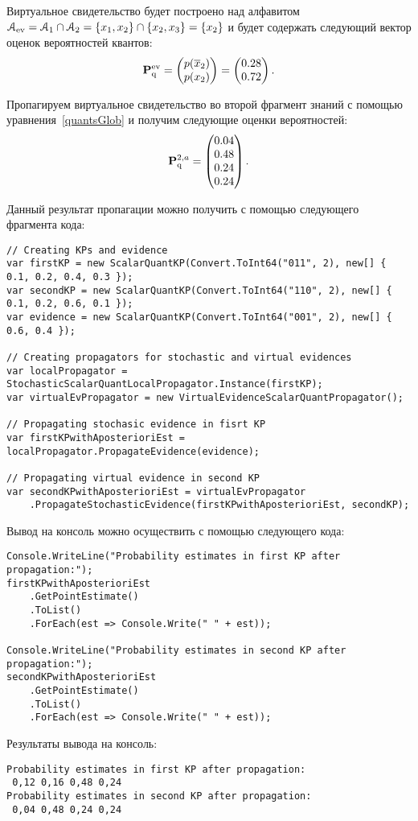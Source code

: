 Виртуальное свидетельство будет построено над алфавитом $\mathcal{A}_{\mathrm{ev}} = \mathcal{A}_1 \cap \mathcal{A}_2 = \{x_1, x_2\} \cap \{x_2, x_3\} = \{x_2\}$ и будет содержать следующий вектор оценок вероятностей квантов:
\begin{equation*}
\mathbf{P}_\mathrm{q}^{\mathrm{ev}} = \begin{pmatrix}  p(\overline{x}_2) \\ p(x_2)	\end{pmatrix} = 
\begin{pmatrix} 0.28 \\ 0.72 \end{pmatrix}.
\end{equation*}

Пропагируем виртуальное свидетельство во второй фрагмент знаний с помощью уравнения~\ref{quantsGlob} и получим следующие оценки вероятностей:
\begin{equation*}
\mathbf{P}_\mathrm{q}^{2,a} = \begin{pmatrix}
0.04 \\ 0.48 \\ 0.24 \\ 0.24
\end{pmatrix}.
\end{equation*}

Данный результат пропагации можно получить с помощью следующего фрагмента кода:

\begin{lstlisting}[caption = Пример пропагации виртуального свидетельства]
// Creating KPs and evidence
var firstKP = new ScalarQuantKP(Convert.ToInt64("011", 2), new[] { 0.1, 0.2, 0.4, 0.3 });
var secondKP = new ScalarQuantKP(Convert.ToInt64("110", 2), new[] { 0.1, 0.2, 0.6, 0.1 });
var evidence = new ScalarQuantKP(Convert.ToInt64("001", 2), new[] { 0.6, 0.4 });

// Creating propagators for stochastic and virtual evidences
var localPropagator = StochasticScalarQuantLocalPropagator.Instance(firstKP);
var virtualEvPropagator = new VirtualEvidenceScalarQuantPropagator();

// Propagating stochasic evidence in fisrt KP
var firstKPwithAposterioriEst = localPropagator.PropagateEvidence(evidence);
            
// Propagating virtual evidence in second KP
var secondKPwithAposterioriEst = virtualEvPropagator
    .PropagateStochasticEvidence(firstKPwithAposterioriEst, secondKP);
\end{lstlisting}

Вывод на консоль можно осуществить с помощью следующего кода:
\begin{lstlisting}[caption = Вывод результатов на консоль]
Console.WriteLine("Probability estimates in first KP after propagation:");
firstKPwithAposterioriEst
    .GetPointEstimate()
    .ToList()
    .ForEach(est => Console.Write(" " + est));
 
Console.WriteLine("Probability estimates in second KP after propagation:");
secondKPwithAposterioriEst
    .GetPointEstimate()
    .ToList()
    .ForEach(est => Console.Write(" " + est));
\end{lstlisting}

Результаты вывода на консоль:
\begin{lstlisting}[caption = Результаты]
Probability estimates in first KP after propagation:
 0,12 0,16 0,48 0,24
Probability estimates in second KP after propagation:
 0,04 0,48 0,24 0,24
\end{lstlisting}
